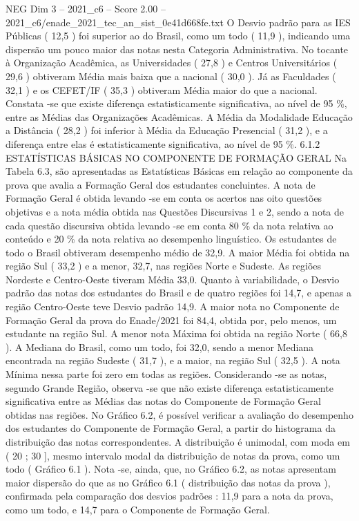 \begin{textsample}{NEG Dim 3 – 2021\_c6 – Score 2.00 – 2021\_c6/enade\_2021\_tec\_an\_sist\_0e41d668fe.txt}
O Desvio padrão para as IES Públicas ( 12,5 ) foi superior ao do Brasil, como um todo ( 11,9 ), indicando uma dispersão um pouco maior das notas nesta Categoria Administrativa.
No tocante à Organização Acadêmica, as Universidades ( 27,8 ) e Centros Universitários ( 29,6 ) obtiveram Média mais baixa que a nacional ( 30,0 ).
Já as Faculdades ( 32,1 ) e os CEFET/IF ( 35,3 ) obtiveram Média maior do que a nacional.
Constata -se que existe diferença estatisticamente significativa, ao nível de 95 \%, entre as Médias das Organizações Acadêmicas.
A Média da Modalidade Educação a Distância ( 28,2 ) foi inferior à Média da Educação Presencial ( 31,2 ), e a diferença entre elas é estatisticamente significativa, ao nível de 95 \%. 6.1.2 ESTATÍSTICAS BÁSICAS NO COMPONENTE DE FORMAÇÃO GERAL Na Tabela 6.3, são apresentadas as Estatísticas Básicas em relação ao componente da prova que avalia a Formação Geral dos estudantes concluintes.
A nota de Formação Geral é obtida levando -se em conta os acertos nas oito questões objetivas e a nota média obtida nas Questões Discursivas 1 e 2, sendo a nota de cada questão discursiva obtida levando -se em conta 80 \% da nota relativa ao conteúdo e 20 \% da nota relativa ao desempenho linguístico.
Os estudantes de todo o Brasil obtiveram desempenho médio de 32,9.
A maior Média foi obtida na região Sul ( 33,2 ) e a menor, 32,7, nas regiões Norte e Sudeste.
As regiões Nordeste e Centro-Oeste tiveram Média 33,0.
Quanto à variabilidade, o Desvio padrão das notas dos estudantes do Brasil e de quatro regiões foi 14,7, e apenas a região Centro-Oeste teve Desvio padrão 14,9.
A maior nota no Componente de Formação Geral da prova do Enade/2021 foi 84,4, obtida por, pelo menos, um estudante na região Sul.
A menor nota Máxima foi obtida na região Norte ( 66,8 ).
A Mediana do Brasil, como um todo, foi 32,0, sendo a menor Mediana encontrada na região Sudeste ( 31,7 ), e a maior, na região Sul ( 32,5 ).
A nota Mínima nessa parte foi zero em todas as regiões.
Considerando -se as notas, segundo Grande Região, observa -se que não existe diferença estatisticamente significativa entre as Médias das notas do Componente de Formação Geral obtidas nas regiões.
No Gráfico 6.2, é possível verificar a avaliação do desempenho dos estudantes do Componente de Formação Geral, a partir do histograma da distribuição das notas correspondentes.
A distribuição é unimodal, com moda em ( 20 ; 30 ], mesmo intervalo modal da distribuição de notas da prova, como um todo ( Gráfico 6.1 ).
Nota -se, ainda, que, no Gráfico 6.2, as notas apresentam maior dispersão do que as no Gráfico 6.1 ( distribuição das notas da prova ), confirmada pela comparação dos desvios padrões : 11,9 para a nota da prova, como um todo, e 14,7 para o Componente de Formação Geral.

\end{textsample}
